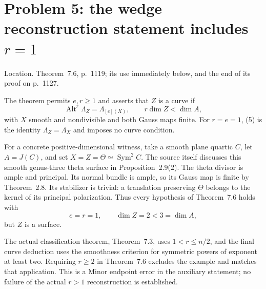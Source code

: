 \documentclass[10pt]{article}
\begin{document}
\section*{Problem 5: the wedge reconstruction statement includes \(r=1\)}
Location. Theorem 7.6, p. 1119; its use immediately below, and the end of its proof on p. 1127.\par
The theorem permits \(e,r\ge1\) and asserts that \(Z\) is a curve if \[\operatorname{Alt}^r\Lambda_Z=\Lambda_{[e](X)},\qquad r\dim Z<\dim A,
 \tag{5}\] with \(X\) smooth and nondivisible and both Gauss maps finite. For \(r=e=1\), (5) is the identity \(\Lambda_Z=\Lambda_X\) and imposes no curve condition.\par
For a concrete positive-dimensional witness, take a smooth plane quartic \(C\), let \(A=J(C)\), and set \(X=Z=\Theta\simeq\operatorname{Sym}^2C\). The source itself discusses this smooth genus-three theta surface in Proposition 2.9(2). The theta divisor is ample and principal. Its normal bundle is ample, so its Gauss map is finite by Theorem 2.8. Its stabilizer is trivial: a translation preserving \(\Theta\) belongs to the kernel of its principal polarization. Thus every hypothesis of Theorem 7.6 holds with \[e=r=1,\qquad \dim Z=2<3=\dim A,\] but \(Z\) is a surface.\par
The actual classification theorem, Theorem 7.3, uses \(1<r\le n/2\), and the final curve deduction uses the smoothness criterion for symmetric powers of exponent at least two. Requiring \(r\ge2\) in Theorem 7.6 excludes the example and matches that application. This is a Minor endpoint error in the auxiliary statement; no failure of the actual \(r>1\) reconstruction is established.\par
\end{document}
